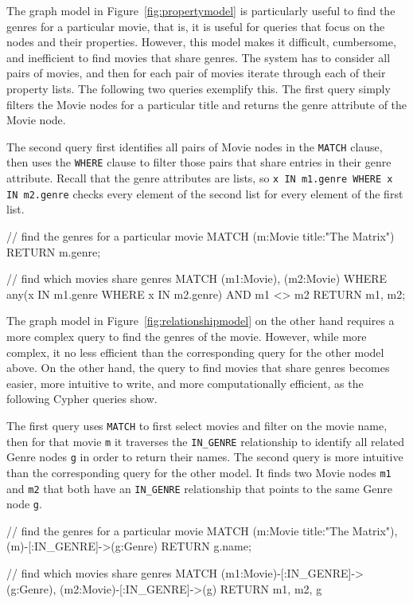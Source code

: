 The graph model in Figure~\ref{fig:propertymodel} is particularly useful to find the genres for a particular movie, that is, it is useful for queries that focus on the nodes and their properties. However, this model makes it difficult, cumbersome, and inefficient to find movies that share genres. The system has to consider all pairs of movies, and then for each pair of movies iterate through each of their property lists. The following two queries exemplify this. The first query simply filters the Movie nodes for a particular title and returns the genre attribute of the Movie node. 

The second query first identifies all pairs of Movie nodes in the \texttt{MATCH} clause, then uses the \texttt{WHERE} clause to filter those pairs that share entries in their genre attribute. Recall that the genre attributes are lists, so \texttt{x IN m1.genre WHERE x IN m2.genre} checks every element of the second list for every element of the first list. 

\begin{cyphercode}
// find the genres for a particular movie
MATCH (m:Movie {title:"The Matrix"})
RETURN m.genre;

// find which movies share genres
MATCH (m1:Movie), (m2:Movie)
WHERE any(x IN m1.genre 
          WHERE x IN m2.genre)
AND m1 <> m2
RETURN m1, m2;
\end{cyphercode}

The graph model in Figure~\ref{fig:relationshipmodel} on the other hand requires a more complex query to find the genres of the movie. However, while more complex, it no less efficient than the corresponding query for the other model above. On the other hand, the query to find movies that share genres becomes easier, more intuitive to write, and more computationally efficient, as the following Cypher queries show.

The first query uses \texttt{MATCH} to first select movies and filter on the movie name, then for that movie \texttt{m} it traverses the \texttt{IN\_GENRE} relationship to identify all related Genre nodes \texttt{g} in order to return their names. The second query is more intuitive than the corresponding query for the other model. It finds two Movie nodes \texttt{m1} and \texttt{m2} that both have an \texttt{IN\_GENRE} relationship that points to the same Genre node \texttt{g}. 

\begin{cyphercode}
// find the genres for a particular movie
MATCH (m:Movie {title:"The Matrix"}),
      (m)-[:IN_GENRE]->(g:Genre)
RETURN g.name;

// find which movies share genres
MATCH (m1:Movie)-[:IN_GENRE]->(g:Genre),
      (m2:Movie)-[:IN_GENRE]->(g)
RETURN m1, m2, g
\end{cyphercode}

